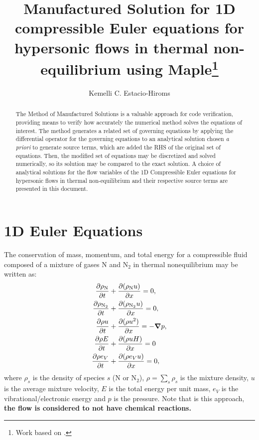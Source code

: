 \documentclass[10pt]{article}
\title{Manufactured Solution for 1D compressible Euler equations for hypersonic flows in thermal non-equilibrium using Maple\footnote{Work based on \citet*{Roy2002,Kirk2009}.}}
\author{Kemelli C. Estacio-Hiroms}
\newcommand{\Diff}[2] {\dfrac{\partial( #1)}{\partial #2}}
\newcommand{\diff}[2] {\dfrac{\partial #1 }{\partial #2}}
\newcommand{\gv}[1]{\ensuremath{\mbox{\boldmath$ #1 $}}}%
\newcommand{\grad}[1]{\gv{\nabla} #1}
\begin{document}
\maketitle

\begin{abstract}
The Method of Manufactured Solutions is a valuable approach for code verification, providing means to verify how accurately the numerical method solves the equations of interest. The method generates a related set of governing equations by applying the differential operator for the governing equations to an analytical solution chosen \textit{a priori} to generate source terms, which are added the RHS of the original set of equations. Then, the modified set of equations may be discretized and solved numerically, so its solution may be compared to the exact solution. A choice of analytical solutions for the flow variables of the 1D Compressible Euler equations for hypersonic flows  in thermal non-equilibrium and their respective source terms are presented in this document.
\end{abstract}




\section{1D Euler Equations}
The conservation of mass, momentum, and total energy for a compressible fluid composed of a %
 mixture of gases N and N$_2$ in thermal nonequilibrium may be written as:
\begin{align}
 \label{eq:pde_comp_mass_N}
 \diff{\rho_{\text{N}}}{t} &+ \Diff{\rho_{\text{N}} u }{x} = 0, \\
\label{eq:pde_comp_mass_N2}
 \diff{\rho_{\text{N}_2}}{t} &+ \Diff{\rho_{\text{N}_2} u }{x} =0 ,\\
 \label{eq:pde_comp_mom}
 \diff{\rho u }{t} &+ \Diff{\rho u^2}{x} = -\grad{p} ,\\
 \label{eq:pde_comp_energy}
 \diff{\rho E}{t} &+ \Diff{\rho  u  H}{x}= 0\\
  \label{eq:pde_comp_energy_V}
\diff{\rho e_V }{t} &+ \Diff{\rho e_V u }{x}= 0,
\end{align}
where $\rho_s$ is the density of species $s$ (N or N$_2$), $\rho=\sum_s \rho_s$ is the mixture density, $ u $ is the average mixture velocity, $E$ is the total energy per unit mass, $e_V$ is the vibrational/electronic energy and $p$ is the pressure. Note that is this approach, \textbf{the flow is considered to not have chemical reactions.}
\end{document}
